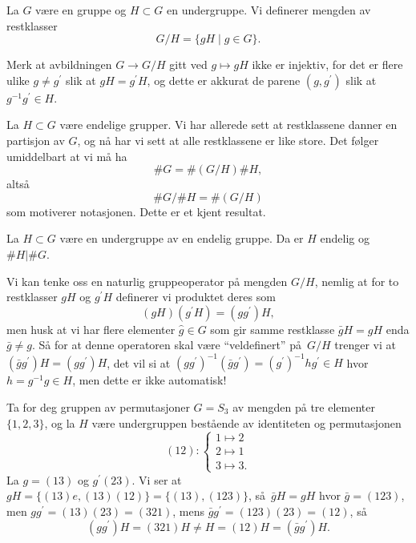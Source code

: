 \begin{definition}
    La $G$ være en gruppe og $H\subset G$ en undergruppe.
    Vi definerer mengden av restklasser
    \[
        G / H = \{ gH \mid g\in G\}.
    \]
\end{definition}

\begin{remark}
    Merk at avbildningen $G\to G / H$ gitt ved $g\mapsto gH$ ikke er injektiv,
    for det er flere ulike $g\neq g^\prime$ slik at $gH = g^\prime H$,
    og dette er akkurat de parene $(g, g^\prime)$ slik at $g^{-1}g^\prime\in H$.
\end{remark}

\begin{example}
    La $H\subset G$ være endelige grupper.
    Vi har allerede sett at restklassene danner en partisjon av $G$,
    og nå har vi sett at alle restklassene er like store.
    Det følger umiddelbart at vi må ha
    \[
        \# G = \# (G / H) \# H,
    \]
    altså
    \[
        \# G / \# H = \# (G / H)
    \]
    som motiverer notasjonen.
    Dette er et kjent resultat.
\end{example}

\begin{corollary}\label{thm:lagrange}
    La $H\subset G$ være en undergruppe av en endelig gruppe.
    Da er $H$ endelig og $\# H | \# G$.
\end{corollary}

Vi kan tenke oss en naturlig gruppeoperator på mengden $G / H$,
nemlig at for to restklasser $gH$ og $g^\prime H$ definerer vi produktet deres som
\[
    (gH)(g^\prime H) = (gg^\prime)H,
\]
men husk at vi har flere elementer $\hat g\in G$ som gir samme restklasse
$\bar gH = gH$ enda $\bar g\neq g$.
Så for at denne operatoren skal være ``veldefinert'' på $G / H$ trenger
vi at $(\bar gg^\prime) H = (g g^\prime)H$,
det vil si at
${(g g^\prime)}^{-1} (\bar g g^\prime) = {(g^\prime)}^{-1} h g^\prime\in H$
hvor $h = g^{-1} g\in H$,
men dette er ikke automatisk!

\begin{example}
    Ta for deg gruppen av permutasjoner $G = S_3$ av mengden på tre elementer $\{1,2,3\}$,
    og la $H$ være undergruppen bestående av identiteten og permutasjonen
    \[
        (12)\colon \begin{cases}
            1\mapsto 2\\
            2\mapsto 1\\
            3\mapsto 3.
        \end{cases}
    \]
    La $g= (13)$ og $g^\prime (23)$.
    Vi ser at $gH = \{(13)e, (13)(12)\} = \{(13), (123)\}$,
    så $\bar gH = gH$ hvor $\bar g = (123)$,
    men $gg^\prime = (13)(23) = (321)$,
    mens $\bar g g^\prime = (123)(23) = (12)$,
    så
    \[
        (gg^\prime)H = (321)H\neq H = (12)H = (\bar g g^\prime)H.
    \]
\end{example}


